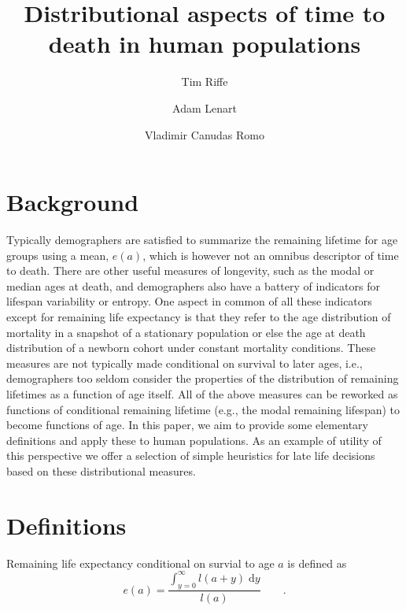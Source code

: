 \documentclass{article}
\newcommand{\dd}{\; \mathrm{d}}
\newcommand{\tp}{\quad\quad\text{.}}
\begin{document}
\title{Distributional aspects of time to death in human populations}

\author[1]{Tim Riffe}
\author[2,3]{Adam Lenart}
\author[2,3]{Vladimir Canudas Romo}


\maketitle

\section{Background}

Typically demographers are satisfied to summarize the remaining lifetime for age
groups using a mean, $e(a)$, which is however not an omnibus descriptor of time
to death. There are other useful measures of longevity, such as
the modal or median ages at death, and demographers also have a battery of
indicators for lifespan variability or entropy. One aspect in common of all
these indicators except for remaining life expectancy is that they refer to the
age distribution of mortality in a snapshot of a stationary population or else
the age at death distribution of a newborn cohort under constant mortality
conditions. These measures are not typically made conditional on survival to
later ages, i.e., demographers too seldom consider the properties of the
distribution of remaining lifetimes as a function of age itself. All of
the above measures can be reworked as functions of conditional remaining
lifetime (e.g., the modal remaining lifespan) to become functions of age.
In this paper, we aim to provide some elementary definitions and
apply these to human populations. As an example of utility of this perspective we offer a
selection of simple heuristics for late life decisions based on these
distributional measures.

\section{Definitions}

Remaining life expectancy conditional on survial to age $a$ is defined as
\begin{equation}
e(a) = \frac{\int_{y=0}^\infty l(a+y) \dd y}{l(a)} \tp
\end{equation}
\end{document}
